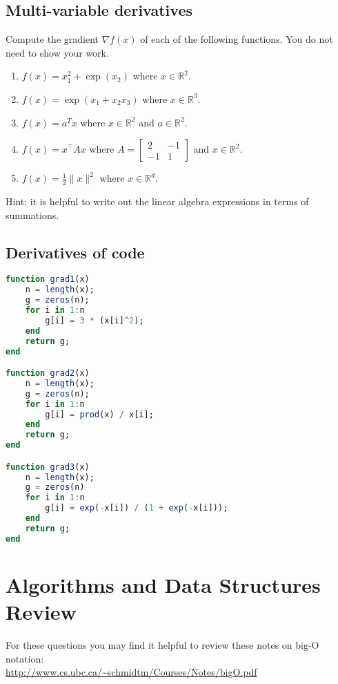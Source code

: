 \documentclass{article}
\def\blu#1{{\color{blu}#1}}
\def\norm#1{\|#1\|}
\def\R{\mathbb{R}}
\begin{document}
\subsection{Multi-variable derivatives}

\blu{Compute the gradient $\nabla f(x)$ of each of the following functions.} You do not need to show your work.
\begin{enumerate}
\item $f(x) = x_1^2 + \exp(x_2)$ where $x \in \R^2$.
\item $f(x) = \exp(x_1 + x_2x_3)$ where $x \in \mathbb{R}^3$.
\item $f(x) = a^Tx$ where $x \in \R^2$ and $a \in \R^2$.
\item $f(x) = x^\top A x$ where $A=\left[ \begin{array}{cc}
2 & -1 \\
 -1 & 1 \end{array} \right]$ and $x \in \mathbb{R}^2$.
 \item $f(x) = \frac{1}{2}\norm{x}^2$ where $x \in \R^d$.
\end{enumerate}

Hint: it is helpful to write out the linear algebra expressions in terms of summations.



\subsection{Derivatives of code}

\begin{lstlisting}[language=julia, frame=single]
function grad1(x)
	n = length(x);
	g = zeros(n);
	for i in 1:n
		g[i] = 3 * (x[i]^2);
	end
	return g;
end

function grad2(x)
	n = length(x);
	g = zeros(n);
	for i in 1:n
		g[i] = prod(x) / x[i];
	end
	return g;
end

function grad3(x)
	n = length(x);
	g = zeros(n)
	for i in 1:n
		g[i] = exp(-x[i]) / (1 + exp(-x[i]));
	end
	return g;
end
\end{lstlisting}

\section{Algorithms and Data Structures Review}

For these questions you may find it helpful to review these notes on big-O notation:\\
\url{http://www.cs.ubc.ca/~schmidtm/Courses/Notes/bigO.pdf}
\end{document}
